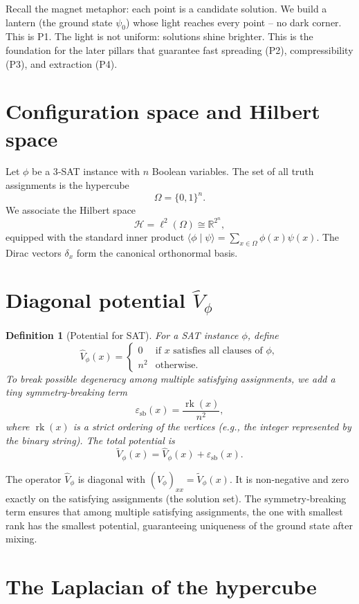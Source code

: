 \documentclass[11pt,a4paper]{article}
\newtheorem{definition}[theorem]{Definition}
\begin{document}
Recall the magnet metaphor: each point is a candidate solution. We build a lantern (the ground state $\psi_0$) whose light reaches every point – no dark corner. This is P1. The light is not uniform: solutions shine brighter. This is the foundation for the later pillars that guarantee fast spreading (P2), compressibility (P3), and extraction (P4).

\section{Configuration space and Hilbert space}

Let $\phi$ be a 3‑SAT instance with $n$ Boolean variables. The set of all truth assignments is the hypercube
\[
\Omega = \{0,1\}^n.
\]
We associate the Hilbert space
\[
\mathcal{H} = \ell^2(\Omega) \cong \mathbb{R}^{2^n},
\]
equipped with the standard inner product $\langle \phi \mid \psi \rangle = \sum_{x\in\Omega} \phi(x)\psi(x)$. The Dirac vectors $\delta_x$ form the canonical orthonormal basis.

\section{Diagonal potential $\hat{V}_\phi$}

\begin{definition}[Potential for SAT]
For a SAT instance $\phi$, define
\[
\hat{V}_\phi(x) = 
\begin{cases}
0 & \text{if } x \text{ satisfies all clauses of } \phi,\\
n^2 & \text{otherwise}.
\end{cases}
\]
To break possible degeneracy among multiple satisfying assignments, we add a tiny symmetry‑breaking term
\[
\varepsilon_{\text{sb}}(x) = \frac{\operatorname{rk}(x)}{n^2},
\]
where $\operatorname{rk}(x)$ is a strict ordering of the vertices (e.g., the integer represented by the binary string). The total potential is
\[
\tilde{V}_\phi(x) = \hat{V}_\phi(x) + \varepsilon_{\text{sb}}(x).
\]
\end{definition}

The operator $\hat{V}_\phi$ is diagonal with $(\hat{V}_\phi)_{xx} = \tilde{V}_\phi(x)$. It is non‑negative and zero exactly on the satisfying assignments (the solution set). The symmetry‑breaking term ensures that among multiple satisfying assignments, the one with smallest rank has the smallest potential, guaranteeing uniqueness of the ground state after mixing.

\section{The Laplacian of the hypercube}
\end{document}
